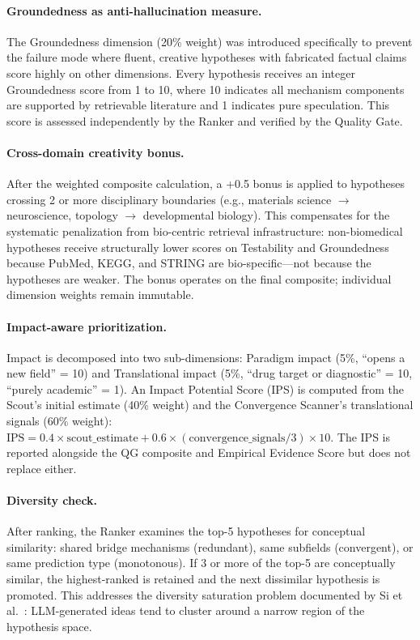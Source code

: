 \paragraph{Groundedness as anti-hallucination measure.} The Groundedness dimension (20\% weight) was introduced specifically to prevent the failure mode where fluent, creative hypotheses with fabricated factual claims score highly on other dimensions. Every hypothesis receives an integer Groundedness score from 1 to 10, where 10 indicates all mechanism components are supported by retrievable literature and 1 indicates pure speculation. This score is assessed independently by the Ranker and verified by the Quality Gate.

\paragraph{Cross-domain creativity bonus.} After the weighted composite calculation, a +0.5 bonus is applied to hypotheses crossing 2 or more disciplinary boundaries (e.g., materials science $\to$ neuroscience, topology $\to$ developmental biology). This compensates for the systematic penalization from bio-centric retrieval infrastructure: non-biomedical hypotheses receive structurally lower scores on Testability and Groundedness because PubMed, KEGG, and STRING are bio-specific---not because the hypotheses are weaker. The bonus operates on the final composite; individual dimension weights remain immutable.

\paragraph{Impact-aware prioritization.} Impact is decomposed into two sub-dimensions: Paradigm impact (5\%, ``opens a new field'' = 10) and Translational impact (5\%, ``drug target or diagnostic'' = 10, ``purely academic'' = 1). An Impact Potential Score (IPS) is computed from the Scout's initial estimate (40\% weight) and the Convergence Scanner's translational signals (60\% weight): $\mathrm{IPS} = 0.4 \times \mathrm{scout\_estimate} + 0.6 \times (\mathrm{convergence\_signals}/3) \times 10$. The IPS is reported alongside the QG composite and Empirical Evidence Score but does not replace either.

\paragraph{Diversity check.} After ranking, the Ranker examines the top-5 hypotheses for conceptual similarity: shared bridge mechanisms (redundant), same subfields (convergent), or same prediction type (monotonous). If 3 or more of the top-5 are conceptually similar, the highest-ranked is retained and the next dissimilar hypothesis is promoted. This addresses the diversity saturation problem documented by Si et al.~\citep{si2024}: LLM-generated ideas tend to cluster around a narrow region of the hypothesis space.

